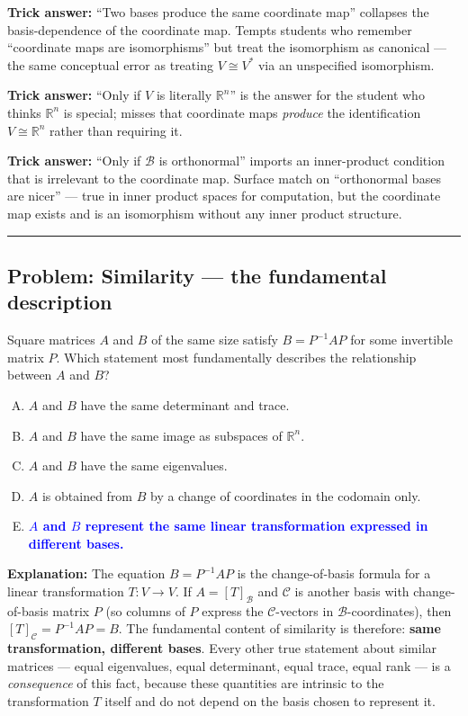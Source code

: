 \documentclass[12pt]{amsart}
\newcommand{\divider}{
  \vspace{-1em}
  \noindent
  \raisebox{-0.15ex}{\textbullet}%
  \hspace{0.5em}%
  \rule[0.5ex]{0.95\textwidth}{1.0pt}%
  \hspace{0.5em}%
  \raisebox{-0.15ex}{\textbullet}%
  \vspace{0em}
}
\begin{document}
\textbf{Trick answer:}
``Two bases produce the same coordinate map'' collapses the basis-dependence
of the coordinate map. Tempts students who remember ``coordinate maps are
isomorphisms'' but treat the isomorphism as canonical --- the same conceptual
error as treating $V \cong V^*$ via an unspecified isomorphism.

\textbf{Trick answer:}
``Only if $V$ is literally $\mathbb{R}^n$'' is the answer for the student
who thinks $\mathbb{R}^n$ is special; misses that coordinate maps
\emph{produce} the identification $V \cong \mathbb{R}^n$ rather than
requiring it.

\textbf{Trick answer:}
``Only if $\mathcal{B}$ is orthonormal'' imports an inner-product condition
that is irrelevant to the coordinate map. Surface match on ``orthonormal
bases are nicer'' --- true in inner product spaces for computation, but
the coordinate map exists and is an isomorphism without any inner product
structure.

\divider

\subsection*{Problem: Similarity --- the fundamental description}

Square matrices $A$ and $B$ of the same size satisfy $B = P^{-1} A P$ for some
invertible matrix $P$. Which statement most fundamentally describes the
relationship between $A$ and $B$?

\begin{enumerate}[(A)]
\item $A$ and $B$ have the same determinant and trace.
\item $A$ and $B$ have the same image as subspaces of $\mathbb{R}^n$.
\item $A$ and $B$ have the same eigenvalues.
\item $A$ is obtained from $B$ by a change of coordinates in the codomain only.
\item \textcolor{blue}{\textbf{$A$ and $B$ represent the same linear transformation expressed in different bases.}}
\end{enumerate}

\textbf{Explanation:}
The equation $B = P^{-1} A P$ is the change-of-basis formula for a linear
transformation $T : V \to V$. If $A = [T]_{\mathcal{B}}$ and $\mathcal{C}$
is another basis with change-of-basis matrix $P$ (so columns of $P$ express
the $\mathcal{C}$-vectors in $\mathcal{B}$-coordinates), then
$[T]_{\mathcal{C}} = P^{-1} A P = B$. The fundamental content of similarity
is therefore: \textbf{same transformation, different bases}. Every other
true statement about similar matrices --- equal eigenvalues, equal determinant,
equal trace, equal rank --- is a \emph{consequence} of this fact, because
these quantities are intrinsic to the transformation $T$ itself and do not
depend on the basis chosen to represent it.
\end{document}
